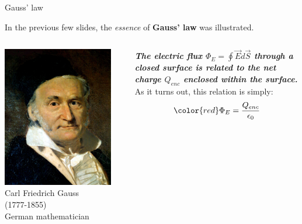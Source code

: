 \begin{frame}{Gauss' law}

In the previous few slides, the {\em essence} of {\bf Gauss' law} was illustrated.\\
\vspace{0.3cm}

\begin{columns}
  \begin{column}{0.33\textwidth}
   \begin{center}
    \includegraphics[width=0.90\textwidth]{./images/people/gauss.jpg}\\
    \vspace{0.2cm}
    {\scriptsize
      Carl Friedrich Gauss\\ (1777-1855)\\ German mathematician\\
    }
   \end{center}
  \end{column}
  \begin{column}{0.67\textwidth}
      {\em \bf
       The electric flux $\Phi_{E} = \oint \vec{E} d\vec{S}$ through a closed surface
       is related to the net charge $Q_{enc}$ enclosed within the surface.\\
      }
      \vspace{0.4cm}
      As it turns out, this relation is simply:
      \begin{equation*}
         {\color{red}
          \Phi_{E} = \frac{Q_{enc}}{\epsilon_0}
         }
      \end{equation*}


\end{column}
\end{columns}
\end{frame}
